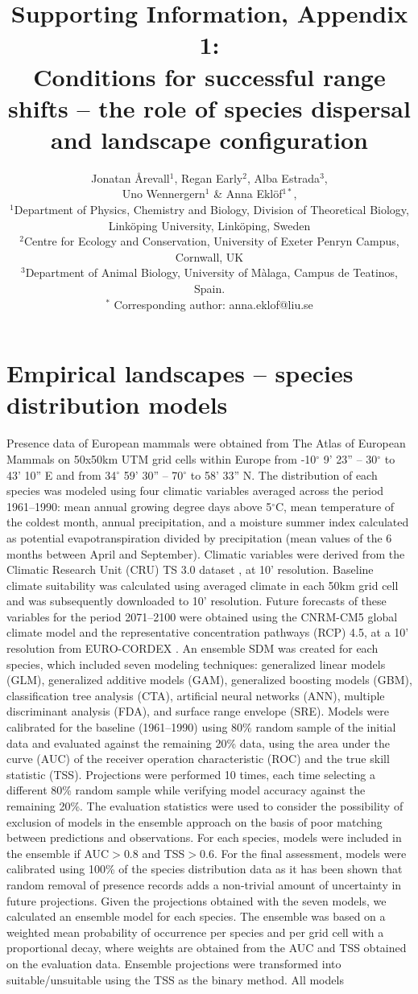 \documentclass[12pt,pdftex]{article}
\date{}
\title{Supporting Information, Appendix 1:\\ Conditions for successful range shifts -- the role of species dispersal and landscape configuration}
\author{Jonatan \r{A}revall$^{1}$,  Regan Early$^{2}$, Alba Estrada$^{3}$, \\ Uno Wennergern$^{1}$ \& Anna Ekl\"{o}f$^{1*}$,\\
  $^1$\small Department of Physics, Chemistry and Biology, Division of Theoretical Biology,\\ \small  Link\"{o}ping University, Link\"{o}ping, Sweden\\
  $^2$\small Centre for Ecology and Conservation, University of Exeter Penryn Campus, Cornwall, UK\\
 $^3$\small Department of Animal Biology, University of M\`{a}laga, Campus de Teatinos, Spain.\\
  $^*$ \small Corresponding author: anna.eklof@liu.se\\
}
\begin{document}
\linenumbers
\maketitle
\baselineskip 18pt

\section*{Empirical landscapes -- species distribution models}

Presence data of European mammals were obtained from The Atlas of European Mammals on 50x50km UTM grid cells within Europe from -10$^{\circ}$ 9' 23'' – 30$^{\circ}$ to 43' 10'' E and from 34$^{\circ}$ 59' 30'' – 70$^{\circ}$ to 58' 33'' N. The distribution of each species was modeled using four climatic variables averaged across the period 1961--1990: mean annual growing degree days above 5$^{\circ}$C, mean temperature of the coldest month, annual precipitation, and a moisture summer index calculated as potential evapotranspiration divided by precipitation (mean values of the 6 months between April and September). Climatic variables were derived from the Climatic Research Unit (CRU) TS 3.0 dataset \citep{Mitchell-Jones}, at 10' resolution. Baseline climate suitability was calculated using averaged climate in each 50km grid cell and was subsequently downloaded to 10' resolution. Future forecasts of these variables for the period 2071--2100 were obtained using the CNRM-CM5 global climate model and the representative concentration pathways (RCP) 4.5, at a 10' resolution from EURO-CORDEX \citep{Jacob2014}. An ensemble SDM was created for each species, which included seven modeling techniques: generalized linear models (GLM), generalized additive models (GAM), generalized boosting models (GBM), classification tree analysis (CTA), artificial neural networks (ANN), multiple discriminant analysis (FDA), and surface range envelope (SRE). Models were calibrated for the baseline (1961--1990) using 80\% random sample of the initial data and evaluated against the remaining 20\% data, using the area under the curve (AUC) of the receiver operation characteristic (ROC) and the true skill statistic (TSS). Projections were performed 10 times, each time selecting a different 80\% random sample while verifying model accuracy against the remaining 20\%. The evaluation statistics were used to consider the possibility of exclusion of models in the ensemble approach on the basis of poor matching between predictions and observations. For each species, models were included in the ensemble if AUC$>$0.8 and TSS$>$0.6. For the final assessment, models were calibrated using 100\% of the species distribution data as it has been shown that random removal of presence records adds a non-trivial amount of uncertainty in future projections. Given the projections obtained with the seven models, we calculated an ensemble model for each species. The ensemble was based on a weighted mean probability of occurrence per species and per grid cell with a proportional decay, where weights are obtained from the AUC and TSS obtained on the evaluation data. Ensemble projections were transformed into suitable/unsuitable using the TSS as the binary method. All models 
\end{document}
